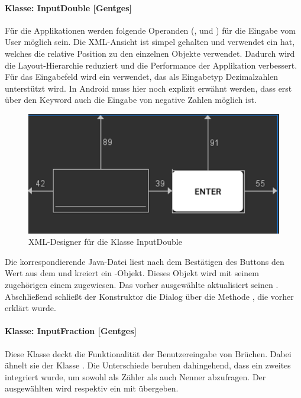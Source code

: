 \paragraph{Klasse: InputDouble [Gentges]}

Für die Applikationen werden folgende Operanden (,  und ) für die Eingabe vom User möglich sein. Die XML-Ansicht ist simpel gehalten und verwendet ein  hat, welches die relative Position zu den einzelnen Objekte verwendet. Dadurch wird die Layout-Hierarchie reduziert und die Performance der Applikation verbessert. Für das Eingabefeld wird ein  verwendet, das als Eingabetyp Dezimalzahlen unterstützt wird. In Android muss hier noch explizit erwähnt werden, dass erst über den Keyword  auch die Eingabe von negative Zahlen möglich ist.

\begin{figure}[h]
	\includegraphics[width=0.6\columnwidth]{img/xml_InputDouble}
	\caption[XML-Designer für die Klassen InputDouble]{XML-Designer für die Klasse InputDouble\footnotemark}
\end{figure}
\FloatBarrier

Die korrespondierende Java-Datei liest nach dem Bestätigen des Buttons den Wert aus dem  und kreiert ein -Objekt. Dieses Objekt wird mit seinem zugehörigen  einem  zugewiesen. Das vorher ausgewählte  aktualisiert seinen . Abschließend schließt der Konstruktor die Dialog über die Methode , die vorher erklärt wurde.

\paragraph{Klasse: InputFraction [Gentges]}

Diese Klasse deckt die Funktionalität der Benutzereingabe von Brüchen. Dabei ähnelt sie der Klasse . Die Unterschiede beruhen dahingehend, dass ein zweites  integriert wurde, um sowohl als Zähler als auch Nenner abzufragen. Der ausgewählten  wird respektiv ein  mit  übergeben. 

